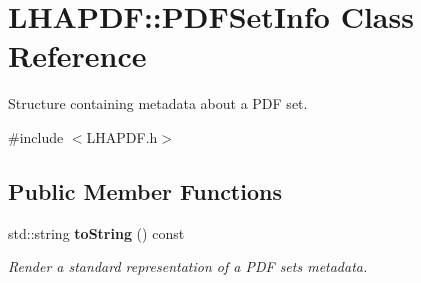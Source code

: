 \section{L\+H\+A\+P\+DF\+:\+:P\+D\+F\+Set\+Info Class Reference}
\label{classLHAPDF_1_1PDFSetInfo}


Structure containing metadata about a P\+DF set.  




{\ttfamily \#include $<$L\+H\+A\+P\+D\+F.\+h$>$}

\subsection*{Public Member Functions}
\begin{DoxyCompactItemize}
\item 
\mbox{\label{classLHAPDF_1_1PDFSetInfo_a9a71fc614766337f991eed1bf8417267}} 
std\+::string \textbf{ to\+String} () const
\begin{DoxyCompactList}\small\item\em Render a standard representation of a P\+DF set\textquotesingle{}s metadata. \end{DoxyCompactList}\end{DoxyCompactItemize}

